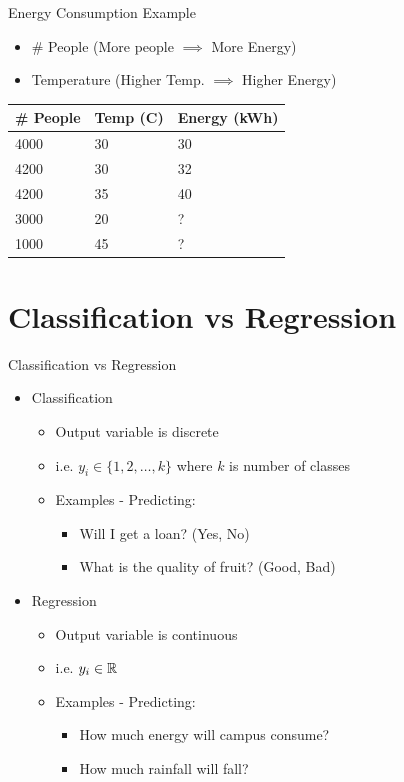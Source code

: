 \documentclass[usenames,dvipsnames]{beamer}
\begin{document}
\begin{frame}{Energy Consumption Example}
\begin{itemize}
	\item \# People (More people $\implies$ More Energy)
	\item \pause Temperature (Higher Temp. $\implies$ Higher Energy)
\end{itemize}

\pause \begin{table}[]
	\begin{tabular}{|l|l||l|}
		\hline 
		
		\textbf{\# People} & \textbf{Temp (C)} &  \textbf{Energy (kWh)} \\ \hline 
		
		4000 & 30 & 30 \\
		4200 & 30 & 32 \\
		4200 & 35 & 40 \\ \hline
		3000 & 20& ? \\
		1000 & 45 & ? \\ \hline          
	\end{tabular}
\end{table}
\end{frame}

\section{Classification vs Regression}

\begin{frame}{Classification vs Regression}
\begin{itemize}
	\item Classification
	\begin{itemize}
		\item \pause Output variable is discrete
		\item \pause i.e.  $y_i \in \{1, 2, \ldots, k\}$ where $k$ is number of classes 
		\item \pause Examples - Predicting: 
		\begin{itemize}
			\item \pause Will I get a loan? (Yes, No)
			\item \pause What is the quality of fruit? (Good, Bad)
		\end{itemize}
	\end{itemize}
	\item \pause Regression
	\begin{itemize}
		\item \pause Output variable is continuous
		\item \pause i.e.  $y_i \in \mathbb{R}$ 
		\item \pause Examples - Predicting: 
		\begin{itemize}
			\item \pause How much energy will campus consume? 
			\item \pause How much rainfall will fall?
		\end{itemize}
	\end{itemize}
\end{itemize}

\end{frame}
\end{document}
